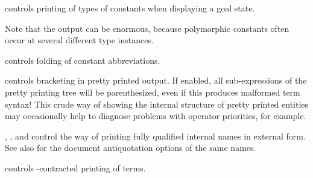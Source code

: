 \begin{isabellebody}
\begin{isamarkuptext}
\begin{description}
  \item \hyperlink{attribute.show-consts}{\mbox{}} controls printing of types of
  constants when displaying a goal state.

  Note that the output can be enormous, because polymorphic constants
  often occur at several different type instances.

  \item \hyperlink{attribute.show-abbrevs}{\mbox{}} controls folding of constant
  abbreviations.

  \item \hyperlink{attribute.show-brackets}{\mbox{}} controls bracketing in pretty
  printed output.  If enabled, all sub-expressions of the pretty
  printing tree will be parenthesized, even if this produces malformed
  term syntax!  This crude way of showing the internal structure of
  pretty printed entities may occasionally help to diagnose problems
  with operator priorities, for example.

  \item \hyperlink{attribute.names-long}{\mbox{}}, \hyperlink{attribute.names-short}{\mbox{}}, and
  \hyperlink{attribute.names-unique}{\mbox{}} control the way of printing fully
  qualified internal names in external form.  See also
   for the document antiquotation options of the
  same names.

  \item \hyperlink{attribute.eta-contract}{\mbox{}} controls -contracted
  printing of terms.


\end{description}
\end{isamarkuptext}
\end{isabellebody}
